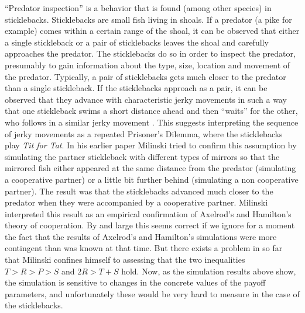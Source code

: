 ``Predator inspection'' is a behavior that is found (among other species) in
sticklebacks. Sticklebacks are small fish living in shoals. If a predator (a
pike for example) comes within a certain range of the shoal, it can be
observed that either a single stickleback or a pair of sticklebacks leaves the
shoal and carefully approaches the predator. The sticklebacks do so in order
to inspect the predator, presumably to gain information about the type, size,
location and movement of the predator. Typically, a pair of sticklebacks gets
much closer to the predator than a single stickleback. If the sticklebacks
approach as a pair, it can be observed that they advance with characteristic
jerky movements in such a way that one stickleback swims a short distance
ahead and then ``waits'' for the other, who follows in a similar jerky
movement \cite[p.\  433]{milinski:1987}.  This suggests interpreting the sequence of jerky
movements as a repeated Prisoner's Dilemma, where the sticklebacks play {\em
  Tit for Tat}. In his earlier paper Milinski tried to confirm this assumption
by simulating the partner stickleback with different types of mirrors so that
the mirrored fish either appeared at the same distance from the predator
(simulating a cooperative partner) or a little bit further behind (simulating
a non cooperative partner).  The result was that the sticklebacks advanced
much closer to the predator when they were accompanied by a cooperative
partner. Milinski interpreted this result as an empirical confirmation of
Axelrod's and Hamilton's theory of cooperation. By and large this seems
correct if we ignore for a moment the fact that the results of Axelrod's and
Hamilton's simulations were more contingent than was known at that time. But
there exists a problem in so far that Milinski confines himself to assessing
that the two inequalities $T>R>P>S$ and $2R > T+S$ hold. Now, as
the simulation results above show, the simulation is sensitive to changes in
the concrete values of the payoff parameters, and unfortunately these would be
very hard to measure in the case of the sticklebacks.

